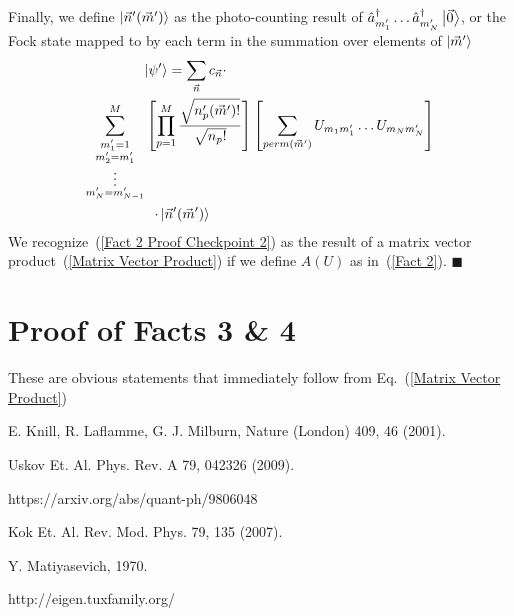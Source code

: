 \documentclass[aps,pra,twocolumn,showpacs,superscriptaddress,floatfix,10pt]{revtex4}
\begin{document}
Finally, we define $\ket{\vec{n}^\prime(\vec{m}^\prime)}$ as the photo-counting result of $\hat{a}_{m_1^\prime}^\dagger \dots \hat{a}_{m_N^\prime}^\dagger \ket{\vec{0}}$, or the Fock state mapped to by each term in the summation over elements of $\ket{\vec{m}^\prime}$
\begin{eqnarray}
\label{Fact 2 Proof Checkpoint 2}
\small \ket{\psi^\prime} = \sum_{\vec{n}} c_{\vec{n}}  \cdot \quad \quad \quad \quad \quad \quad \quad \quad \quad \quad \quad \quad \quad \quad \quad \quad  \\ \sum^M_{\substack{m_1^\prime = 1\\
		m_2^\prime = m_1^\prime\\
		\vdots \\
		m_N^\prime = m_{N-1}^\prime}}
\left[ \prod_{p=1}^{M} \frac{\sqrt{n_p^\prime(\vec{m}^\prime) !}}{ \sqrt{n_p !}} \right] \left[ \sum_{perm(\vec{m}^\prime)} U_{m_1 m_1^\prime} \dots U_{m_N m_N^\prime} \right] \nonumber \\
\cdot \ket{\vec{n}^\prime (\vec{m}^\prime) } \quad \quad \quad \quad \quad \quad \quad \quad \quad \quad \quad \quad \quad \quad \quad \quad \nonumber
\end{eqnarray}
We recognize~(\ref{Fact 2 Proof Checkpoint 2}) as the result of a matrix vector product~(\ref{Matrix Vector Product}) if we define $A(U)$ as in~(\ref{Fact 2}).  $ \blacksquare $
\section{Proof of Facts 3 \& 4}
These are obvious statements that immediately follow from Eq.~(\ref{Matrix Vector Product})

\begin{thebibliography}{99}

  E. Knill, R. Laflamme, G. J. Milburn, Nature (London) 409, 46 (2001).

 Uskov Et. Al.
Phys. Rev. A 79, 042326 (2009).

 https://arxiv.org/abs/quant-ph/9806048

 Kok Et. Al.
Rev. Mod. Phys. 79, 135 (2007).

 Y. Matiyasevich, 1970.

 http://eigen.tuxfamily.org/

\end{thebibliography}
\end{document}
